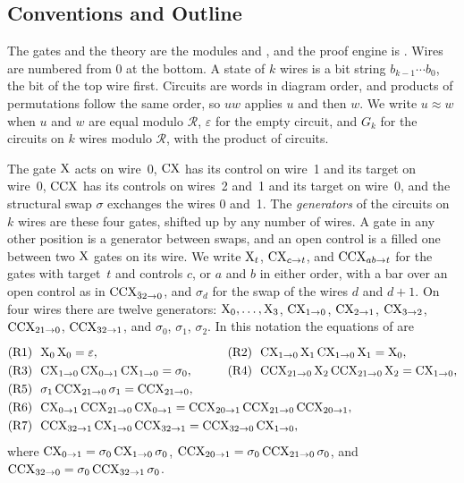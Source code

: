 \documentclass[acmsmall,screen,nonacm]{acmart}
\begin{document}
\subsection{Conventions and Outline}\label{app:xcxccx-conventions}

The gates and the theory are the modules  and , and the proof engine is . Wires are numbered from $0$ at the bottom. A state of $k$ wires is a bit string $b_{k-1}\cdots b_0$, the bit of the top wire first. Circuits are words in diagram order, and products of permutations follow the same order, so $uw$ applies $u$ and then $w$. We write $u\approx w$ when $u$ and $w$ are equal modulo $\mathcal{R}$, $\varepsilon$ for the empty circuit, and $G_k$ for the circuits on $k$ wires modulo $\mathcal{R}$, with the product of circuits.

The gate $\mathrm{X}$ acts on wire~0, $\mathrm{CX}$ has its control on wire~1 and its target on wire~0, $\mathrm{CCX}$ has its controls on wires~2 and~1 and its target on wire~0, and the structural swap $\sigma$ exchanges the wires 0 and~1. The \emph{generators} of the circuits on $k$ wires are these four gates, shifted up by any number of wires. A gate in any other position is a generator between swaps, and an open control is a filled one between two $\mathrm{X}$ gates on its wire. We write $\mathrm{X}_t$, $\mathrm{CX}_{c\to t}$, and $\mathrm{CCX}_{ab\to t}$ for the gates with target~$t$ and controls $c$, or $a$ and $b$ in either order, with a bar over an open control as in $\mathrm{CCX}_{\bar3 2\to0}$, and $\sigma_d$ for the swap of the wires $d$ and $d+1$. On four wires there are twelve generators: $\mathrm{X}_0,\dots,\mathrm{X}_3$, $\mathrm{CX}_{1\to0}$, $\mathrm{CX}_{2\to1}$, $\mathrm{CX}_{3\to2}$, $\mathrm{CCX}_{21\to0}$, $\mathrm{CCX}_{32\to1}$, and $\sigma_0$, $\sigma_1$, $\sigma_2$. In this notation the equations of  are
\[
\renewcommand{\arraystretch}{1.25}
\begin{array}{@{}l@{\qquad\quad}l@{}}
\xrule{1}\ \ \X_0\,\X_0=\varepsilon, & \xrule{2}\ \ \CX_{1\to0}\,\X_1\,\CX_{1\to0}\,\X_1=\X_0,\\
\xrule{3}\ \ \CX_{1\to0}\,\CX_{0\to1}\,\CX_{1\to0}=\sigma_0, & \xrule{4}\ \ \CCX_{21\to0}\,\X_2\,\CCX_{21\to0}\,\X_2=\CX_{1\to0},\\
\multicolumn{2}{@{}l@{}}{\xrule{5}\ \ \sigma_1\,\CCX_{21\to0}\,\sigma_1=\CCX_{21\to0},}\\
\multicolumn{2}{@{}l@{}}{\xrule{6}\ \ \CX_{0\to1}\,\CCX_{21\to0}\,\CX_{0\to1}=\CCX_{20\to1}\,\CCX_{21\to0}\,\CCX_{20\to1},}\\
\multicolumn{2}{@{}l@{}}{\xrule{7}\ \ \CCX_{32\to1}\,\CX_{1\to0}\,\CCX_{32\to1}=\CCX_{32\to0}\,\CX_{1\to0},}
\end{array}
\]
where $\mathrm{CX}_{0\to1}=\sigma_0\,\mathrm{CX}_{1\to0}\,\sigma_0$, $\mathrm{CCX}_{20\to1}=\sigma_0\,\mathrm{CCX}_{21\to0}\,\sigma_0$, and $\mathrm{CCX}_{32\to0}=\sigma_0\,\mathrm{CCX}_{32\to1}\,\sigma_0$.
\end{document}
